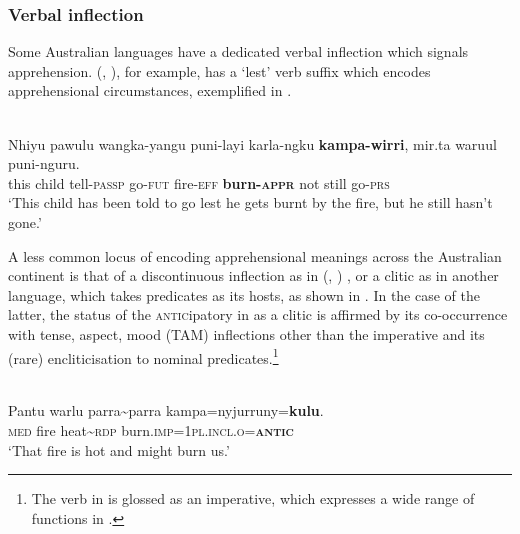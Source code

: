 \documentclass[output=paper,colorlinks,citecolor=brown]{langscibook}
\begin{document}
\subsubsection{Verbal inflection}

Some Australian languages have a dedicated verbal inflection which signals apprehension.  (, ), for example, has a `lest' verb suffix which encodes apprehensional circumstances, exemplified in .

\ea
{} \\
\gll Nhiyu pawulu wangka-yangu puni-layi karla-ngku \textbf{kampa-wirri}, mir.ta waruul puni-nguru. \\
this child tell-\textsc{passp} go-\textsc{fut} fire-\textsc{eff} \textbf{burn-\textsc{appr}} not still go-\textsc{prs}\\
\glt `This child has been told to go lest he gets burnt by the fire, but he still hasn't gone.'
\label{ex:bro7}
\z

A less common locus of encoding apprehensional meanings across the Australian continent is that of a discontinuous inflection as in  (, ) \citep[165, 186--187]{sharp_nyangumarta_2004}, or a clitic as in another  language,  \citep[335]{agnew_core_2020} which takes predicates as its hosts, as shown in . In the case of the latter, the status of the \textsc{antic}ipatory in  as a clitic is affirmed by its co-occurrence with tense, aspect, mood (TAM) inflections other than the imperative and its (rare) encliticisation to nominal predicates.\footnote{The verb in  is glossed as an imperative, which expresses a wide range of functions in  \citep[320]{agnew_core_2020}.}

\ea
{} \\
\gll Pantu warlu parra\textasciitilde parra kampa=nyjurruny=\textbf{kulu}. \\
\textsc{med} fire heat\textasciitilde \textsc{rdp} burn.\textsc{imp}=\textsc{1pl.incl.o=\textbf{antic}} \\
\glt `That fire is hot and might burn us.'
\label{ex:bro8}
\z
\end{document}
